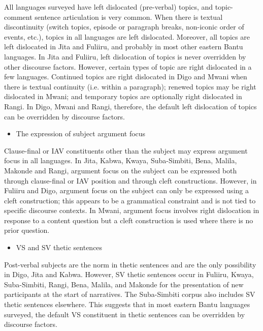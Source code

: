 \documentclass[output=paper]{langsci/langscibook}
\begin{document}
All languages surveyed have left dislocated (pre-verbal) topics, and topic-comment sentence articulation is very common. When there is textual discontinuity (switch topics, episode or paragraph breaks, non-iconic order of events, etc.), topics in all languages are left dislocated. Moreover, all topics are left dislocated in Jita and Fuliiru, and probably in most other eastern Bantu languages. In Jita and Fuliiru, left dislocation of topics is never overridden by other discourse factors. However, certain types of topic are right dislocated in a few languages. Continued topics are right dislocated in Digo and Mwani when there is textual continuity (i.e. within a paragraph); renewed topics may be right dislocated in Mwani; and temporary topics are optionally right dislocated in Rangi. In Digo, Mwani and Rangi, therefore, the default left dislocation of topics can be overridden by discourse factors.

\begin{itemize}
\item The expression of subject argument focus
\end{itemize}

Clause-final or IAV constituents other than the subject may express argument focus in all languages. In Jita, Kabwa, Kwaya, Suba-Simbiti, Bena, Malila, Makonde and Rangi, argument focus on the subject can be expressed both through clause-final or IAV position and through cleft constructions. However, in Fuliiru and Digo, argument focus on the subject can only be expressed using a cleft construction; this appears to be a grammatical constraint and is not tied to specific discourse contexts. In Mwani, argument focus involves right dislocation in response to a content question but a cleft construction is used where there is no prior question.

\begin{itemize}
\item VS and SV thetic sentences
\end{itemize}

Post-verbal subjects are the norm in thetic sentences and are the only possibility in Digo, Jita and Kabwa. However, SV thetic sentences occur in Fuliiru, Kwaya, Suba-Simbiti, Rangi, Bena, Malila, and Makonde for the presentation of new participants at the start of narratives. The Suba-Simbiti corpus also includes SV thetic sentences elsewhere. This suggests that in most eastern Bantu languages surveyed, the default VS constituent in thetic sentences can be overridden by discourse factors.
\end{document}
